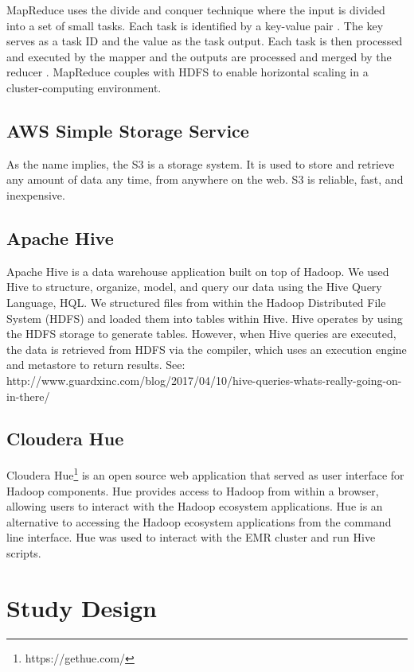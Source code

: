 \documentclass[journal]{IEEEtran}
\begin{document}
MapReduce uses the divide and conquer technique where the input is divided into a set of small tasks. Each task is identified by a key-value 
pair \cite{Divide-and-Conquer}. The key serves as a task ID and the value as the task output. Each task is then processed and executed by the 
mapper and the outputs are processed and merged by the reducer \cite{MapReduce}. MapReduce couples with HDFS to enable horizontal
scaling in a cluster-computing environment.

\subsection{AWS Simple Storage Service}

As the name implies, the S3 is a storage system.
It is used to store and retrieve any amount of data any time, from anywhere on the web. 
S3 is reliable, fast, and inexpensive.

\subsection{Apache Hive}

Apache Hive is a data warehouse application built on top of Hadoop. We used Hive to structure, organize, model, and query our data using the Hive Query Language, HQL. We structured files from within the Hadoop Distributed File System (HDFS) and loaded them into tables within Hive. Hive operates by using the HDFS storage to generate tables. However, when Hive queries are executed, the data is retrieved from HDFS via the compiler, which uses an execution engine and metastore to return results. See: http://www.guardxinc.com/blog/2017/04/10/hive-queries-whats-really-going-on-in-there/

\subsection{Cloudera Hue}

Cloudera Hue\footnote{https://gethue.com/}
 is an open source web application that served as user interface for Hadoop components.
Hue provides access to Hadoop from within a browser, allowing users to interact with the Hadoop ecosystem applications. 
Hue is an alternative to accessing the Hadoop ecosystem applications from the command line interface.
Hue was used to interact with the EMR cluster and run Hive scripts.



\section{Study Design}
\label{StudyDesign}
\end{document}
